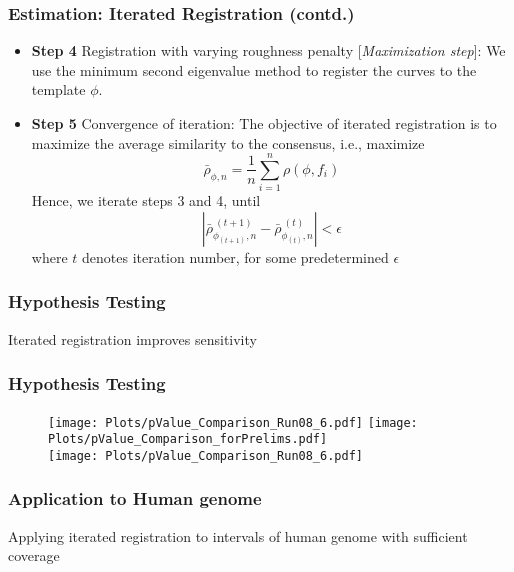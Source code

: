 \documentclass[10pt,dvipsnames,table]{beamer}
\begin{document}
\begin{frame}
\frametitle{Estimation: Iterated Registration (contd.)}
\begin{itemize}
\pause
\item {\bf{Step 4}} Registration with varying roughness penalty [{\emph{Maximization step}}]: We use the minimum second eigenvalue method to register the curves to the template $\phi$. 
\pause
\item {\bf{Step 5}} Convergence of iteration: The objective of iterated registration is to maximize the average similarity to the consensus, i.e., maximize 
\[ \bar{\rho}_{\phi, n} = \frac{1}{n} \sum \limits_{i = 1}^{n} \rho(\phi, f_i)\]
Hence, we iterate steps 3 and 4, until
\[ |\bar{\rho}_{\phi_{(t+1)}, n}^{\ (t+1)} - \bar{\rho}_{\phi_{(t)}, n}^{ \ (t)} | < \epsilon \]
where $t$ denotes iteration number, for some predetermined $\epsilon$
\end{itemize}
\end{frame}

\begin{frame}
\frametitle{Hypothesis Testing}
\Large
Iterated registration improves sensitivity
\end{frame}

\begin{frame}
\frametitle{Hypothesis Testing}
\vspace{-0.5cm}
\begin{figure}
\begin{center}
\texttt{[image: Plots/pValue\_Comparison\_Run08\_6.pdf]}
\hspace{2cm}
\pause
\texttt{[image: Plots/pValue\_Comparison\_forPrelims.pdf]} \\
\pause
\vspace{-1cm}
\texttt{[image: Plots/pValue\_Comparison\_Run08\_6.pdf]}
\end{center}
\end{figure}
\end{frame}

\begin{frame}
\frametitle{Application to Human genome}
\Large
Applying iterated registration to intervals of human genome with sufficient coverage
\end{frame}
\end{document}
